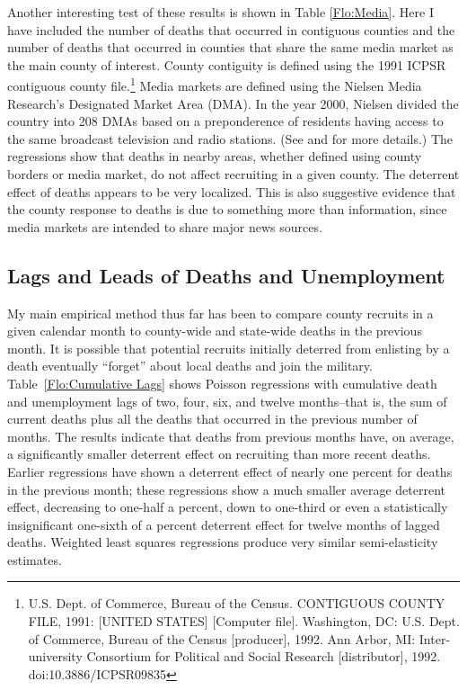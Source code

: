\documentclass[12pt] {article}
\begin{document}
Another interesting test of these results is shown in Table \ref{Flo:Media}.
Here I have included the number of deaths that occurred in contiguous
counties and the number of deaths that occurred in counties that share
the same media market as the main county of interest. County contiguity
is defined using the 1991 ICPSR contiguous county file.\footnote{U.S. Dept. of Commerce, Bureau of the Census. CONTIGUOUS COUNTY FILE,
1991: {[}UNITED STATES{]} {[}Computer file{]}. Washington, DC: U.S.
Dept. of Commerce, Bureau of the Census {[}producer{]}, 1992. Ann
Arbor, MI: Inter- university Consortium for Political and Social Research
{[}distributor{]}, 1992. doi:10.3886/ICPSR09835 
} Media markets are defined using the Nielsen Media Research's Designated
Market Area (DMA). In the year 2000, Nielsen divided the country into 208 DMAs based on a preponderence of residents having access to the same broadcast television and radio stations.   (See \cite{DMAsource1} and \cite{DMAsource2} for more details.) The regressions show that deaths in nearby areas, whether defined using county borders or media market, do not affect
recruiting in a given county. The deterrent effect of deaths appears
to be very localized. This is also suggestive evidence that the county response to deaths is due to something more than information, since media markets are intended to share major news sources. 

\subsection{Lags and Leads of Deaths and Unemployment\label{sub:Lags}}
My main empirical method thus far has been to compare county recruits
in a given calendar month to county-wide and state-wide deaths in
the previous month. It is possible that potential recruits initially
deterred from enlisting by a death eventually {}``forget'' about
local deaths and join the military. Table~\ref{Flo:Cumulative Lags}
shows Poisson regressions with cumulative death and unemployment lags
of two, four, six, and twelve months--that is, the sum of current
deaths plus all the deaths that occurred in the previous number of
months. The results indicate that deaths from previous months have,
on average, a significantly smaller deterrent effect on recruiting
than more recent deaths. Earlier regressions have shown a deterrent
effect of nearly one percent for deaths in the previous month; these
regressions show a much smaller average deterrent effect, decreasing
to one-half a percent, down to one-third or even a statistically insignificant
one-sixth of a percent deterrent effect for twelve months of lagged
deaths. Weighted least squares regressions produce very similar semi-elasticity
estimates.
\end{document}
